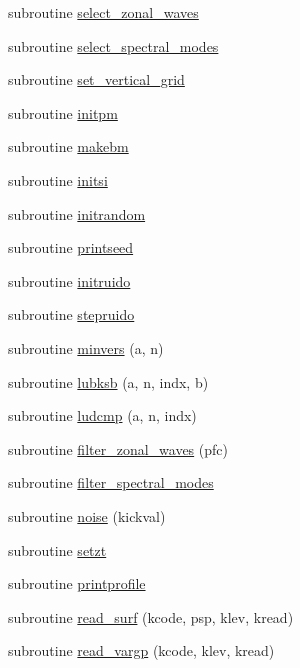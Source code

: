 \begin{DoxyCompactItemize}
subroutine \hyperlink{puma_8f90_af1e6869836cefedb3f5cc8a574944d91}{select\-\_\-zonal\-\_\-waves}
\item 
subroutine \hyperlink{puma_8f90_a01c0a9ea1eee2f86044600c5e81dbebd}{select\-\_\-spectral\-\_\-modes}
\item 
subroutine \hyperlink{puma_8f90_a00e3481744c3185f0f91d35c101f28e4}{set\-\_\-vertical\-\_\-grid}
\item 
subroutine \hyperlink{puma_8f90_a5087a1dafe7b39d03c6547fde711b55a}{initpm}
\item 
subroutine \hyperlink{puma_8f90_aa2b3f98ff1c27bb557c695c15708ad1f}{makebm}
\item 
subroutine \hyperlink{puma_8f90_a96b9223819624937b18b4e5b29e95a91}{initsi}
\item 
subroutine \hyperlink{puma_8f90_acbd8e7fdd2e1f60dbca741a700fb292a}{initrandom}
\item 
subroutine \hyperlink{puma_8f90_a9a888c599145a63cdd108dffa553b509}{printseed}
\item 
subroutine \hyperlink{puma_8f90_aea6c13c68157972ea21768a5ea43e154}{initruido}
\item 
subroutine \hyperlink{puma_8f90_ab257e27330a3ab13c9c90ebd985ef60e}{stepruido}
\item 
subroutine \hyperlink{puma_8f90_ac5b1247975fc97ef45931e410766a417}{minvers} (a, n)
\item 
subroutine \hyperlink{puma_8f90_a13d49d9c008cbc01f37c0c31d2012ad4}{lubksb} (a, n, indx, b)
\item 
subroutine \hyperlink{puma_8f90_afa767a8d587c360ca92357e066b6bf22}{ludcmp} (a, n, indx)
\item 
subroutine \hyperlink{puma_8f90_a7278b4e4c576939f77bc4055e51cdaef}{filter\-\_\-zonal\-\_\-waves} (pfc)
\item 
subroutine \hyperlink{puma_8f90_a9a1e7493444984ad2c2161609dbb6e69}{filter\-\_\-spectral\-\_\-modes}
\item 
subroutine \hyperlink{puma_8f90_abdcee9a4a4d07fc6e5b7a7f5768026ac}{noise} (kickval)
\item 
subroutine \hyperlink{puma_8f90_a4a662c6d6619fc6405eb110f62653dc0}{setzt}
\item 
subroutine \hyperlink{puma_8f90_aa92d6879772b364173e13521d835895e}{printprofile}
\item 
subroutine \hyperlink{puma_8f90_aa8533c8ebc4415ef95ca9c34c4ba7d6b}{read\-\_\-surf} (kcode, psp, klev, kread)
\item 
subroutine \hyperlink{puma_8f90_a9dfa3f46641f3df498d07ff40df08a57}{read\-\_\-vargp} (kcode, klev, kread)

\end{DoxyCompactItemize}
